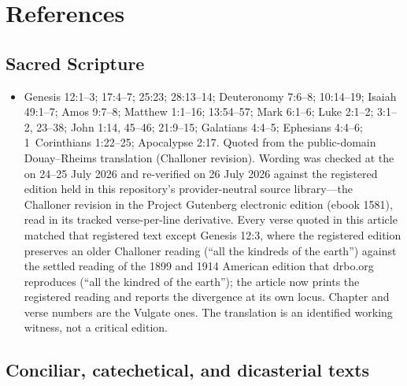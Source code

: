 \section{References}

\begingroup
\sloppy

\subsection*{Sacred Scripture}

{\fontsize{8.6}{9.6}\selectfont
\begin{itemize}[itemsep=0pt,parsep=0pt,topsep=0.05em]
\item Genesis 12:1--3; 17:4--7; 25:23; 28:13--14; Deuteronomy 7:6--8; 10:14--19; Isaiah 49:1--7; Amos 9:7--8; Matthew 1:1--16; 13:54--57; Mark 6:1--6; Luke 2:1--2; 3:1--2, 23--38; John 1:14, 45--46; 21:9--15; Galatians 4:4--5; Ephesians 4:4--6; 1~Corinthians 1:22--25; Apocalypse 2:17. Quoted from the public-domain Douay--Rheims translation (Challoner revision). Wording was checked at the  on 24--25 July 2026 and re-verified on 26 July 2026 against the registered edition held in this repository's provider-neutral source library---the Challoner revision in the Project Gutenberg electronic edition (ebook 1581), read in its tracked verse-per-line derivative. Every verse quoted in this article matched that registered text except Genesis 12:3, where the registered edition preserves an older Challoner reading (``all the kindreds of the earth'') against the settled reading of the 1899 and 1914 American edition that drbo.org reproduces (``all the kindred of the earth''); the article now prints the registered reading and reports the divergence at its own locus. Chapter and verse numbers are the Vulgate ones. The translation is an identified working witness, not a critical edition.
\end{itemize}}

\subsection*{Conciliar, catechetical, and dicasterial texts}

